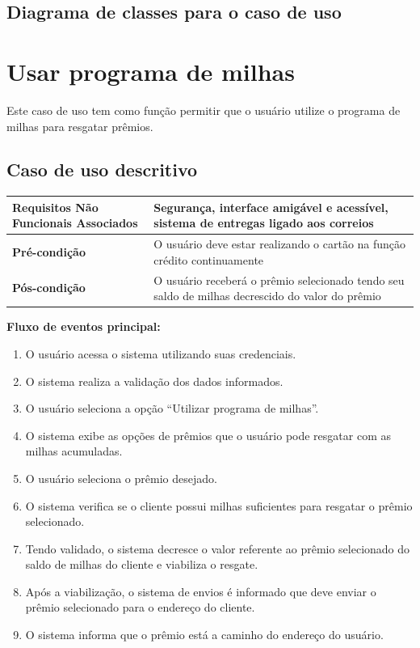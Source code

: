 \subsection{Diagrama de classes para o caso de uso}

\section{Usar programa de milhas}

Este caso de uso tem como função permitir que o usuário utilize o programa de milhas para resgatar prêmios.

\subsection{Caso de uso descritivo}

\begin{table}[h]
  \centering
  \begin{tabular}{|p{4cm} | p{10cm} |}
      \hline
      \small{\textbf{Requisitos Não Funcionais Associados}}	& Segurança, interface amigável e acessível, sistema de entregas ligado aos correios	\\ \hline
      \small{\textbf{Pré-condição}}	&	O usuário deve estar realizando o cartão na função crédito continuamente	\\ \hline
      \small{\textbf{Pós-condição}}	&	O usuário receberá o prêmio selecionado tendo seu saldo de milhas decrescido do valor do prêmio	\\ \hline
    \end{tabular}
\end{table}

\textbf{Fluxo de eventos principal:}

\begin{enumerate}
  \item O usuário acessa o sistema utilizando suas credenciais.
  \item O sistema realiza a validação dos dados informados.
  \item O usuário seleciona a opção ``Utilizar programa de milhas''.
  \item O sistema exibe as opções de prêmios que o usuário pode resgatar com as milhas acumuladas.
  \item O usuário seleciona o prêmio desejado.
  \item O sistema verifica se o cliente possui milhas suficientes para resgatar o prêmio selecionado.
  \item Tendo validado, o sistema decresce o valor referente ao prêmio selecionado do saldo de milhas do cliente e viabiliza o resgate.
  \item Após a viabilização, o sistema de envios é informado que deve enviar o prêmio selecionado para o endereço do cliente.
  \item O sistema informa que o prêmio está a caminho do endereço do usuário.
\end{enumerate}


